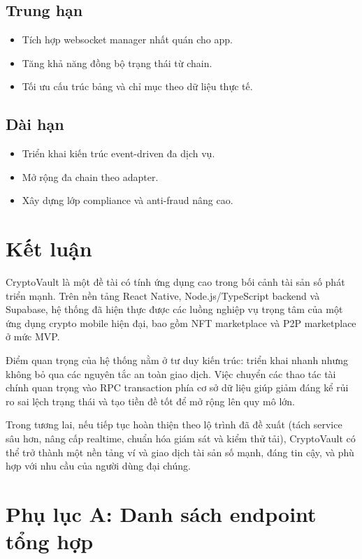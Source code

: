 \documentclass[a4paper,12pt]{report}
\begin{document}
\section{Trung hạn}
\begin{itemize}
    \item Tích hợp websocket manager nhất quán cho app.
    \item Tăng khả năng đồng bộ trạng thái từ chain.
    \item Tối ưu cấu trúc bảng và chỉ mục theo dữ liệu thực tế.
\end{itemize}

\section{Dài hạn}
\begin{itemize}
    \item Triển khai kiến trúc event-driven đa dịch vụ.
    \item Mở rộng đa chain theo adapter.
    \item Xây dựng lớp compliance và anti-fraud nâng cao.
\end{itemize}

\chapter{Kết luận}
CryptoVault là một đề tài có tính ứng dụng cao trong bối cảnh tài sản số phát triển mạnh. Trên nền tảng React Native, Node.js/TypeScript backend và Supabase, hệ thống đã hiện thực được các luồng nghiệp vụ trọng tâm của một ứng dụng crypto mobile hiện đại, bao gồm NFT marketplace và P2P marketplace ở mức MVP.

Điểm quan trọng của hệ thống nằm ở tư duy kiến trúc: triển khai nhanh nhưng không bỏ qua các nguyên tắc an toàn giao dịch. Việc chuyển các thao tác tài chính quan trọng vào RPC transaction phía cơ sở dữ liệu giúp giảm đáng kể rủi ro sai lệch trạng thái và tạo tiền đề tốt để mở rộng lên quy mô lớn.

Trong tương lai, nếu tiếp tục hoàn thiện theo lộ trình đã đề xuất (tách service sâu hơn, nâng cấp realtime, chuẩn hóa giám sát và kiểm thử tải), CryptoVault có thể trở thành một nền tảng ví và giao dịch tài sản số mạnh, đáng tin cậy, và phù hợp với nhu cầu của người dùng đại chúng.

\appendix
\chapter{Phụ lục A: Danh sách endpoint tổng hợp}
\end{document}
